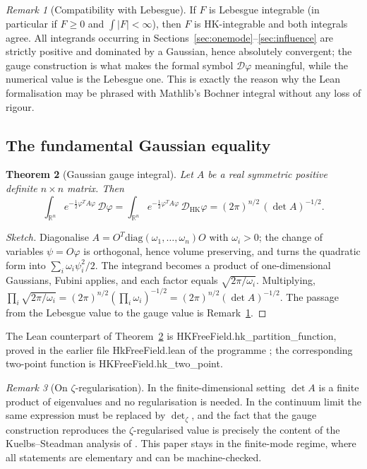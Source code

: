\documentclass[11pt,a4paper]{article}
\theoremstyle{plain}
\newtheorem{theorem}{Theorem}[section]
\theoremstyle{definition}
\theoremstyle{remark}
\newtheorem{remark}[theorem]{Remark}
\newcommand{\dphi}{\mathcal{D}\varphi}
\newcommand{\dhk}{\mathcal{D}_{\mathrm{HK}}\varphi}
\newcommand{\R}{\mathbb{R}}
\let\leanoldunderscore\_
\newcommand{\leanbreakunderscore}{\leanoldunderscore\allowbreak}
\newcommand{\lean}[1]{{\ttfamily\hyphenchar\font=-1\relax
  \let\_\leanbreakunderscore #1}}
\begin{document}
\begin{remark}[Compatibility with Lebesgue]
\label{rem:compat}
If $F$ is Lebesgue integrable (in particular if $F\ge0$ and $\int|F|<\infty$), then $F$ is
HK-integrable and both integrals agree. All integrands occurring in
Sections~\ref{sec:onemode}--\ref{sec:influence} are strictly positive and dominated by a
Gaussian, hence absolutely convergent; the gauge construction is what makes the formal
symbol $\dphi$ meaningful, while the numerical value is the Lebesgue one. This is exactly
the reason why the Lean formalisation may be phrased with Mathlib's Bochner integral
without any loss of rigour.
\end{remark}

\subsection{The fundamental Gaussian equality}

\begin{theorem}[Gaussian gauge integral]
\label{thm:gauss}
Let $A$ be a real symmetric positive definite $n\times n$ matrix. Then
\[
\int_{\R^{n}} e^{-\frac12\varphi^{T}A\varphi}\,\dphi
=
\int_{\R^{n}} e^{-\frac12\varphi^{T}A\varphi}\,\dhk
=(2\pi)^{n/2}\,(\det A)^{-1/2}.
\]
\end{theorem}

\begin{proof}[Sketch]
Diagonalise $A=O^{T}\mathrm{diag}(\omega_1,\dots,\omega_n)O$ with $\omega_i>0$; the
change of variables $\psi=O\varphi$ is orthogonal, hence volume preserving, and turns the
quadratic form into $\sum_i\omega_i\psi_i^2/2$. The integrand becomes a product of
one-dimensional Gaussians, Fubini applies, and each factor equals
$\sqrt{2\pi/\omega_i}$. Multiplying, $\prod_i\sqrt{2\pi/\omega_i}
=(2\pi)^{n/2}(\prod_i\omega_i)^{-1/2}=(2\pi)^{n/2}(\det A)^{-1/2}$. The passage from the
Lebesgue value to the gauge value is Remark~\ref{rem:compat}.
\end{proof}

The Lean counterpart of Theorem~\ref{thm:gauss} is
\lean{HKFreeField.hk\_partition\_function}, proved in the earlier file
\lean{HkFreeField.lean} of the programme \cite{Berdinsky2026HK}; the corresponding
two-point function is \lean{HKFreeField.hk\_two\_point}.

\begin{remark}[On $\zeta$-regularisation]
In the finite-dimensional setting $\det A$ is a finite product of eigenvalues and no
regularisation is needed. In the continuum limit the same expression must be replaced by
${\det}_\zeta$, and the fact that the gauge construction reproduces the
$\zeta$-regularised value is precisely the content of the Kuelbs--Steadman analysis of
\cite{GillZachary2008,EspositoGill2025}. This paper stays in the finite-mode regime,
where all statements are elementary and can be machine-checked.
\end{remark}
\end{document}

